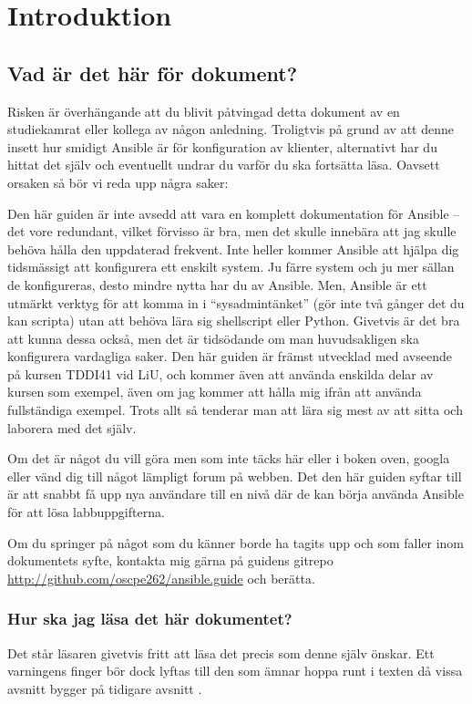 \section{Introduktion}
\subsection{Vad är det här för dokument?}
Risken är överhängande att du blivit påtvingad detta dokument av en studiekamrat eller kollega av någon anledning. 
Troligtvis på grund av att denne insett hur smidigt Ansible är för konfiguration av klienter, 
alternativt har du hittat det själv och eventuellt undrar du varför du ska fortsätta läsa. Oavsett orsaken så bör vi reda upp några saker:

Den här guiden är inte avsedd att vara en komplett dokumentation för Ansible -- det vore redundant, vilket förvisso är bra, men det skulle innebära att jag skulle behöva hålla den uppdaterad frekvent.
Inte heller kommer Ansible att hjälpa dig tidsmässigt att konfigurera ett enskilt system. Ju färre system och ju mer sällan de konfigureras, desto mindre nytta har du av Ansible.
Men, Ansible är ett utmärkt verktyg för att komma in i ``sysadmintänket'' (gör inte två gånger det du kan scripta) utan att behöva lära sig shellscript eller Python. Givetvis är det bra att kunna dessa också, men det är tidsödande
om man huvudsakligen ska konfigurera vardagliga saker.
Den här guiden är främst utvecklad med avseende på kursen TDDI41 vid LiU, och kommer även att använda enskilda delar av kursen som exempel, även om jag kommer att hålla mig ifrån att använda fullständiga exempel.
Trots allt så tenderar man att lära sig mest av att sitta och laborera med det själv.

Om det är något du vill göra men som inte täcks här eller i boken oven, googla eller vänd dig till något lämpligt forum på webben. 
Det den här guiden syftar till är att snabbt få upp nya användare till en nivå där de kan börja använda Ansible för att lösa labbuppgifterna.

Om du springer på något som du känner borde ha tagits upp och som faller inom dokumentets syfte, kontakta mig gärna på guidens gitrepo \href{http://github.com/oscpe262/ansible.guide}{\url{http://github.com/oscpe262/ansible.guide}} och berätta.

\subsubsection{Hur ska jag läsa det här dokumentet?}
Det står läsaren givetvis fritt att läsa det precis som denne själv önskar. Ett varningens finger bör dock lyftas till den som ämnar hoppa runt i texten då vissa avsnitt bygger på tidigare avsnitt
.%

